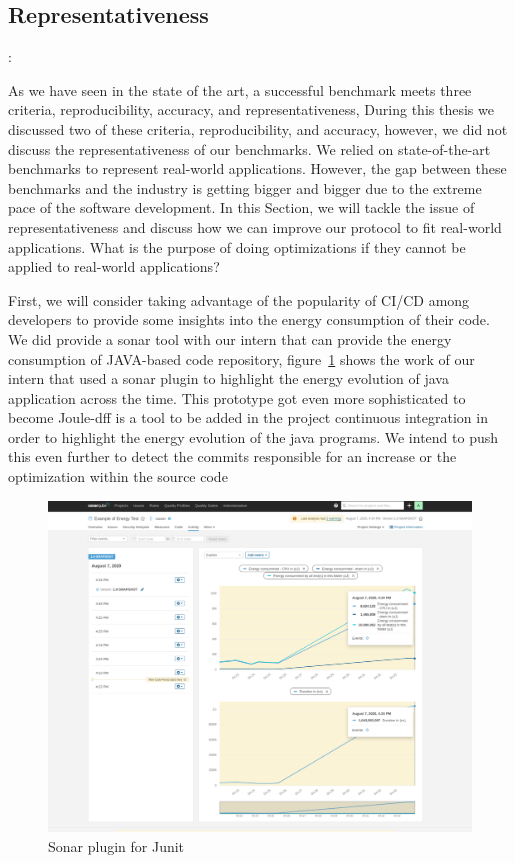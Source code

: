 \subsection*{Representativeness}:

As we have seen in the state of the art, a successful benchmark meets three criteria, reproducibility, accuracy, and representativeness, During this thesis we discussed two of these criteria, reproducibility, and accuracy, however, we did not discuss the representativeness of our benchmarks. We relied on state-of-the-art benchmarks to represent real-world applications. However, the gap between these benchmarks and the industry is getting bigger and bigger due to the extreme pace of the software development. In this Section, we will tackle the issue of representativeness and discuss how we can improve our protocol to fit real-world applications.
What is the purpose of doing optimizations if they cannot be applied to real-world applications?

First, we will consider taking advantage of the popularity of CI/CD among developers to provide some insights into the energy consumption of their code.
We did provide a sonar tool with our intern that can provide the energy consumption of JAVA-based code repository, figure~\ref{fig:JunitSonarplugin} shows the work of our intern that used a sonar plugin to highlight the energy evolution of java application across the time. This prototype got even more sophisticated to become Joule-dff  is a tool to be added in the project continuous integration in order to highlight the energy evolution of the java programs.
We intend to push this even further to detect the  commits responsible for an increase or the optimization within the source code

\begin{figure}[!h]
      \centering
      \includegraphics[width=0.8\linewidth]{chapters/JunitSonarplugin}
      \caption{Sonar plugin for Junit}
      \label{fig:JunitSonarplugin}
\end{figure}



